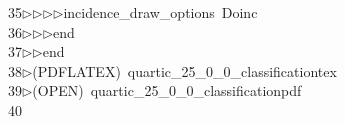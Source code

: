 \begin{tabbing}
35\>$\triangleright$\>$\triangleright$\>$\triangleright$\>$\triangleright$\>incidence\_draw\_options\ Doinc\ \\[0pt]
36\>$\triangleright$\>$\triangleright$\>$\triangleright$\>end\ \\[0pt]
37\>$\triangleright$\>$\triangleright$\>end\\[0pt]
38\>$\triangleright$\>(PDFLATEX)\ quartic\_25\_0\_0\_classificationtex\\[0pt]
39\>$\triangleright$\>(OPEN)\ quartic\_25\_0\_0\_classificationpdf\\[0pt]
40\>\end{tabbing}
